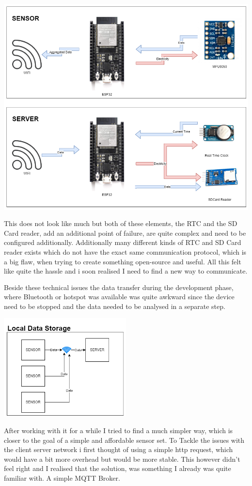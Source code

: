 \includegraphics[width=\linewidth]{images/CommunicationDiagrammExplenation.png}

This does not look like much but both of these elements, the RTC and the SD Card reader, add an additional point of failure, are quite complex and need to be configured additionally. Additionally many different kinds of RTC and SD Card reader exists which do not have the exact same communication protocol, which is a big flaw, when trying to create something open-source and useful. All this felt like quite the hassle and i soon realised I need to find a new way to communicate.

Beside these technical issues the data transfer during the development phase, where Bluetooth or hotspot was available was quite awkward since the device need to be stopped and the data needed to be analysed in a separate step. 


\begin{center}
\includegraphics[width=0.5\textwidth]{images/CommunicationDiagrammLocal.png}
 \end{center}
After working with it for a while I tried to find a much simpler way, which is closer to the goal of a simple and affordable sensor set. To Tackle the issues with the client server network i first thought of using a simple http request, which would have a bit more overhead but would be more stable. This however didn't feel right and I realised that the solution, was something I already was quite familiar with. A simple MQTT Broker. 



